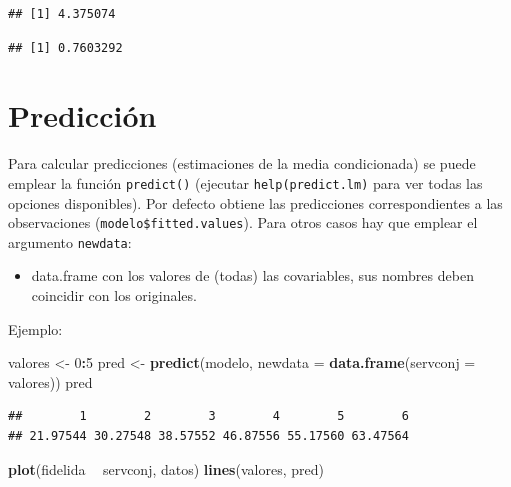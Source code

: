 \documentclass[]{book}
\newenvironment{Shaded}{\begin{snugshade}}{\end{snugshade}}
\newcommand{\DataTypeTok}[1]{\textcolor[rgb]{0.13,0.29,0.53}{#1}}
\newcommand{\DecValTok}[1]{\textcolor[rgb]{0.00,0.00,0.81}{#1}}
\newcommand{\KeywordTok}[1]{\textcolor[rgb]{0.13,0.29,0.53}{\textbf{#1}}}
\newcommand{\NormalTok}[1]{#1}
\newcommand{\OperatorTok}[1]{\textcolor[rgb]{0.81,0.36,0.00}{\textbf{#1}}}
\newcommand{\StringTok}[1]{\textcolor[rgb]{0.31,0.60,0.02}{#1}}
\providecommand{\tightlist}{%
  \setlength{\itemsep}{0pt}\setlength{\parskip}{0pt}}
\begin{document}
\begin{verbatim}
## [1] 4.375074
\end{verbatim}

\begin{Shaded}
\end{Shaded}

\begin{verbatim}
## [1] 0.7603292
\end{verbatim}

\hypertarget{prediccion}{%
\section{Predicción}\label{prediccion}}

Para calcular predicciones (estimaciones de la media condicionada) se puede emplear la función \texttt{predict()} (ejecutar \texttt{help(predict.lm)} para ver todas las opciones disponibles).
Por defecto obtiene las predicciones correspondientes a las observaciones (\texttt{modelo\$fitted.values}). Para otros casos hay que emplear el argumento \texttt{newdata}:

\begin{itemize}
\tightlist
\item
  data.frame con los valores de (todas) las covariables, sus nombres
  deben coincidir con los originales.
\end{itemize}

Ejemplo:

\begin{Shaded}
\begin{Highlighting}[]
\NormalTok{valores <-}\StringTok{ }\DecValTok{0}\OperatorTok{:}\DecValTok{5}
\NormalTok{pred <-}\StringTok{ }\KeywordTok{predict}\NormalTok{(modelo, }\DataTypeTok{newdata =} \KeywordTok{data.frame}\NormalTok{(}\DataTypeTok{servconj =}\NormalTok{ valores))}
\NormalTok{pred}
\end{Highlighting}
\end{Shaded}

\begin{verbatim}
##        1        2        3        4        5        6 
## 21.97544 30.27548 38.57552 46.87556 55.17560 63.47564
\end{verbatim}

\begin{Shaded}
\begin{Highlighting}[]
\KeywordTok{plot}\NormalTok{(fidelida }\OperatorTok{~}\StringTok{ }\NormalTok{servconj, datos)}
\KeywordTok{lines}\NormalTok{(valores, pred)}
\end{Highlighting}
\end{Shaded}
\end{document}
